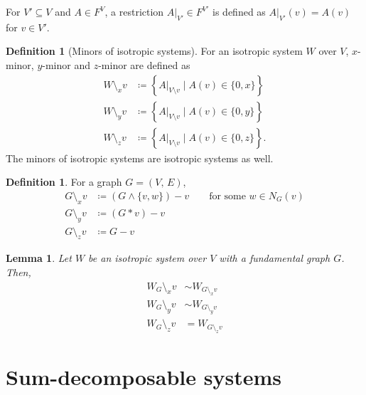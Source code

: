 \documentclass[twoside,10pt]{article}
\newtheorem{lemma}[theorem]{Lemma}
\theoremstyle{definition}
\newtheorem{definition}[theorem]{Definition}
\theoremstyle{remark}
\begin{document}
For $V'\subseteq V$ and $A\in F^V$, a restriction $A|_{V'}\in F^{V'}$ is defined as $A|_{V'}(v)=A(v)$ for $v\in V'$.
\begin{definition}[Minors of isotropic systems]
For an isotropic system $W$ over $V$, $x$-minor, $y$-minor and $z$-minor are defined as
\begin{align*}
W\setminus_x v&\coloneqq\left\{A|_{V\setminus v}\mid A(v)\in\{0,x\}\right\}\\
W\setminus_y v&\coloneqq\left\{A|_{V\setminus v}\mid A(v)\in\{0,y\}\right\}\\
W\setminus_z v&\coloneqq\left\{A|_{V\setminus v}\mid A(v)\in\{0,z\}\right\}.
\end{align*}
The minors of isotropic systems are isotropic systems as well.
\end{definition}

\begin{definition}
For a graph $G=(V,\,E)$,
\begin{align*}
G\setminus_x v &\coloneqq (G\wedge \{v,w\})-v\qquad \text{for some $w\in N_G(v)$}\\
G\setminus_y v &\coloneqq (G*v) - v\\
G\setminus_z v &\coloneqq G - v
\end{align*}
\end{definition}

\begin{lemma}
Let $W$ be an isotropic system over $V$ with a fundamental graph $G$.
Then,
\begin{align*}
W_G \setminus_x v &\sim W_{G\setminus_x v}\\
W_G \setminus_y v &\sim W_{G\setminus_y v}\\
W_G \setminus_z v &= W_{G\setminus_z v}
\end{align*}
\end{lemma}

\section{Sum-decomposable systems}
\end{document}
